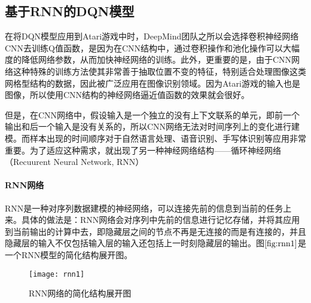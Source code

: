 
\subsection{基于RNN的DQN模型}
在将DQN模型应用到Atari游戏中时\citep{mnih2013playing}，DeepMind团队之所以会选择卷积神经网络CNN去训练Q值函数，是因为在CNN结构中，通过卷积操作和池化操作可以大幅度的降低网络参数，从而加快神经网络的训练。此外，更重要的是，由于CNN网络这种特殊的训练方法使其非常善于抽取位置不变的特征，特别适合处理图像这类网格型结构的数据，因此被广泛应用在图像识别领域。因为Atari游戏的输入也是图像，所以使用CNN结构的神经网络逼近值函数的效果就会很好。

但是，在CNN网络中，假设输入是一个独立的没有上下文联系的单元，即前一个输出和后一个输入是没有关系的，所以CNN网络无法对时间序列上的变化进行建模。而样本出现的时间顺序对于自然语言处理、语音识别、手写体识别等应用非常重要。为了适应这种需求，就出现了另一种神经网络结构——循环神经网络（Recuurent Neural Network, RNN）

 \paragraph{RNN网络}
RNN是一种对序列数据建模的神经网络，可以连接先前的信息到当前的任务上来。具体的做法是：RNN网络会对序列中先前的信息进行记忆存储，并将其应用到当前输出的计算中去，即隐藏层之间的节点不再是无连接的而是有连接的，并且隐藏层的输入不仅包括输入层的输入还包括上一时刻隐藏层的输出。图$\ref{fig:rnn1}$是一个RNN模型的简化结构展开图。
\begin{figure}[htbp]
\centering
\texttt{[image: rnn1]}
\caption{RNN网络的简化结构展开图}
\label{fig:rnn1}
\end{figure}


